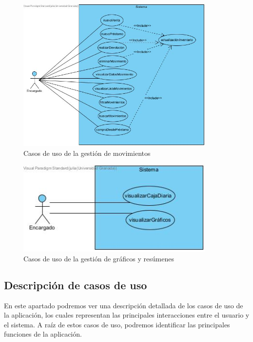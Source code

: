 \begin{figure}[H]
	\centering
	\includegraphics[width=0.88\textwidth]{imagenes/imagenesDiagramas/useCases/useCaseMovimiento.jpg}
	\caption{Casos de uso de la gestión de movimientos}
	\label{fig:usecaseMovimientos}
\end{figure}

\begin{figure}[H]
	\centering
	\includegraphics[width=0.88\textwidth]{imagenes/imagenesDiagramas/useCases/useCaseGraficos.jpg}
	\caption{Casos de uso de la gestión de gráficos y resúmenes}
	\label{fig:usecaseGraficos}
\end{figure}

\newpage

\subsection{Descripción de casos de uso}

En este apartado podremos ver una descripción detallada de los casos de uso de la aplicación, los cuales representan las principales interacciones entre el usuario y el sistema. A raíz de estos casos de uso, podremos identificar las principales funciones de la aplicación. 

